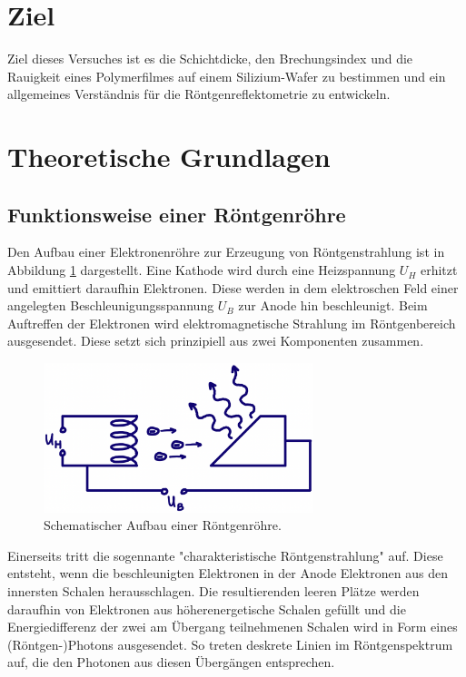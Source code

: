 \section{Ziel}
    Ziel dieses Versuches ist es die Schichtdicke, den Brechungsindex und
    die Rauigkeit eines Polymerfilmes auf einem Silizium-Wafer zu bestimmen
    und ein allgemeines Verständnis für die Röntgenreflektometrie zu entwickeln.
\section{Theoretische Grundlagen}
    \subsection{Funktionsweise einer Röntgenröhre}
        Den Aufbau einer Elektronenröhre zur Erzeugung von Röntgenstrahlung ist in Abbildung \ref{fig:Rohr} dargestellt.
        Eine Kathode wird durch eine Heizspannung $U_H$ erhitzt und emittiert daraufhin Elektronen.
        Diese werden in dem elektroschen Feld einer angelegten Beschleunigungsspannung $U_B$ zur Anode hin beschleunigt.
        Beim Auftreffen der Elektronen wird elektromagnetische Strahlung im Röntgenbereich ausgesendet.
        Diese setzt sich prinzipiell aus zwei Komponenten zusammen.
        \begin{figure}[h]
            \centering
            \includegraphics[width = 0.7\textwidth]{pictures/Rohr.png}
            \caption{Schematischer Aufbau einer Röntgenröhre.}
            \label{fig:Rohr}
        \end{figure}
        Einerseits tritt die sogennante "charakteristische Röntgenstrahlung" auf.
        Diese entsteht, wenn die beschleunigten Elektronen in der Anode Elektronen aus den innersten Schalen herausschlagen.
        Die resultierenden leeren Plätze werden daraufhin von Elektronen aus höherenergetische Schalen gefüllt und die Energiedifferenz
        der zwei am Übergang teilnehmenen Schalen wird in Form eines (Röntgen-)Photons ausgesendet.
        So treten deskrete Linien im Röntgenspektrum auf, die den Photonen aus diesen Übergängen entsprechen.

